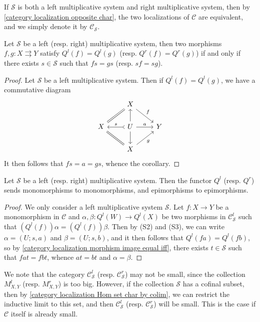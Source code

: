\begin{remark}
If $\mathcal{S}$ is both a left multiplicative system and right multiplicative system, then by \cref{category localization opposite char}, the two localizations of $\mathcal{C}$ are equivalent, and we simply denote it by $\mathcal{C}_\mathcal{S}$.
\end{remark}

\begin{corollary}\label{category localization morphism image equal iff}
Let $\mathcal{S}$ be a left (resp. right) multiplicative system, then two morphisms $f,g:X\rightrightarrows Y$ satisfy $Q^l(f)=Q^l(g)$ (resp. $Q^r(f)=Q^r(g)$) if and only if there exists $s\in\mathcal{S}$ such that $fs=gs$ (resp. $sf=sg$).
\end{corollary}
\begin{proof}
Let $\mathcal{S}$ be a left multiplicative system. Then if $Q^l(f)=Q^l(g)$, we have a commutative diagram
\[\begin{tikzcd}
&X\ar[rd,"f"]\ar[ld,equal]&\\
X&U\ar[l,"s",tail,swap]\ar[u]\ar[d]\ar[r,"a"]&Y\\
&X\ar[ru,swap,"g"]\ar[lu,equal]&
\end{tikzcd}\]
It then follows that $fs=a=gs$, whence the corollary.
\end{proof}

\begin{corollary}\label{category localization functor mono and epi}
Let $\mathcal{S}$ be a left (resp. right) multiplicative system. Then the functor $Q^l$ (resp. $Q^r$) sends monomorphisms to monomorphisms, and epimorphisms to epimorphisms.
\end{corollary}
\begin{proof}
We only consider a left multiplicative system $\mathcal{S}$. Let $f:X\to Y$ be a monomorphism in $\mathcal{C}$ and $\alpha,\beta:Q^l(W)\to Q^l(X)$ be two morphisms in $\mathcal{C}_\mathcal{S}^l$ such that $(Q^l(f))\alpha=(Q^l(f))\beta$. Then by (S2) and (S3), we can write $\alpha=(U;s,a)$ and $\beta=(U;s,b)$, and it then follows that $Q^l(fa)=Q^l(fb)$, so by \cref{category localization morphism image equal iff}, there exists $t\in\mathcal{S}$ such that $fat=fbt$, whence $at=bt$ and $\alpha=\beta$.
\end{proof}

\begin{remark}
We note that the category $\mathcal{C}_\mathcal{S}^l$ (resp. $\mathcal{C}_\mathcal{S}^r$) may not be small, since the collection $M_{X,Y}^l$ (resp. $M_{X,Y}^r$) is too big. However, if the collection $\mathcal{S}$ has a cofinal subset, then by \cref{category localization Hom set char by colim}, we can restrict the inductive limit to this set, and then $\mathcal{C}_\mathcal{S}^l$ (resp. $\mathcal{C}_\mathcal{S}^r$) will be small. This is the case if $\mathcal{C}$ itself is already small. 
\end{remark}

